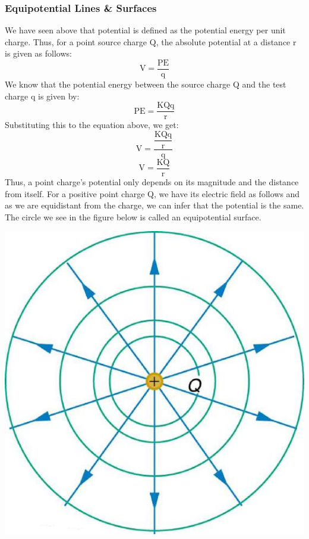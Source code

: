 \documentclass[9pt]{article}
\begin{document}
	\subsubsection*{Equipotential Lines \& Surfaces}
	We have seen above that potential is defined as the potential energy per unit charge. Thus, for a point source charge Q, the absolute potential at a distance r is given as follows:
	$$\text{V}=\dfrac{\text{PE}}{\text{q}}$$
	We know that the potential energy between the source charge Q and the test charge q is given by:
	$$\text{PE}=\dfrac{\text{KQq}}{\text{r}}$$
	Substituting this to the equation above, we get:
	$$\text{V}=\dfrac{\dfrac{\text{KQq}}{\text{r}}}{\text{q}}$$
	$$\text{V}=\dfrac{\text{KQ}}{\text{r}}$$
	Thus, a point charge's potential only depends on its magnitude and the distance from itself. For a positive point charge Q, we have its electric field as follows and as we are equidistant from the charge, we can infer that the potential is the same. The circle we see in the figure below is called an equipotential surface.\begin{center}
		\includegraphics[scale=0.2]{equip_1}
	\end{center}
\end{document}
